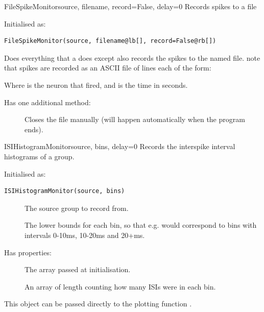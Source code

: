 \documentclass[letterpaper,10pt]{manual}
\begin{document}
\hypertarget{brian.FileSpikeMonitor}{}\begin{classdesc}{FileSpikeMonitor}{source, filename, record=False, delay=0}
Records spikes to a file

Initialised as:

\begin{Verbatim}[commandchars=@\[\]]
FileSpikeMonitor(source, filename@lb[], record=False@rb[])
\end{Verbatim}

Does everything that a \hyperlink{brian.SpikeMonitor}{} does except also records
the spikes to the named file. note that spikes are recorded
as an ASCII file of lines each of the form:
\begin{quote}

\end{quote}

Where  is the neuron that fired, and  is the time in seconds.

Has one additional method:
\begin{description}
\item[]
Closes the file manually (will happen automatically when
the program ends).

\end{description}
\end{classdesc}


\hypertarget{brian.ISIHistogramMonitor}{}\begin{classdesc}{ISIHistogramMonitor}{source, bins, delay=0}
Records the interspike interval histograms of a group.

Initialised as:

\begin{Verbatim}[commandchars=@\[\]]
ISIHistogramMonitor(source, bins)
\end{Verbatim}
\begin{description}
\item[]
The source group to record from.

\item[]
The lower bounds for each bin, so that e.g.
 would correspond to
bins with intervals 0-10ms, 10-20ms and
20+ms.

\end{description}

Has properties:
\begin{description}
\item[]
The  array passed at initialisation.

\item[]
An array of length  counting how many ISIs
were in each bin.

\end{description}

This object can be passed directly to the plotting function
\hyperlink{brian.hist_plot}{}.
\end{classdesc}
\end{document}

